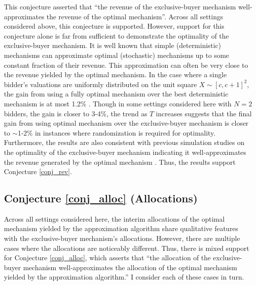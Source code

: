 This conjecture asserted that ``the revenue of the exclusive-buyer mechanism well-approximates the revenue of the optimal mechanism''. Across all settings considered above, this conjecture is supported. However, support for this conjecture alone is far from sufficient to demonstrate the optimality of the exclusive-buyer mechanism. It is well known that simple (deterministic) mechanisms can approximate optimal (stochastic) mechanisms up to some constant fraction of their revenue. This approximation can often be very close to the revenue yielded by the optimal mechanism. In the case where a single bidder's valuations are uniformly distributed on the unit square $X \sim [c,c+1]^2$, the gain from using a fully optimal mechanism over the best deterministic mechanism is at most 1.2\% \autocite[p11]{pavlov2011optimal}. Though in some settings considered here with $N=2$ bidders, the gain is closer to 3-4\%, the trend as $T$ increases suggests that the final gain from using optimal mechanism over the exclusive-buyer mechanism is closer to $\sim$1-2\% in instances where randomization is required for optimality. Furthermore, the results are also consistent with previous simulation studies on the optimality of the exclusive-buyer mechanism indicating it well-approximates the revenue generated by the optimal mechanism \autocite{belloni2010multidimensional}. Thus, the results support Conjecture \ref{conj_rev}.

\subsection{Conjecture \ref{conj_alloc} (Allocations)}

Across all settings considered here, the interim allocations of the optimal mechanism yielded by the approximation algorithm share qualitative features with the exclusive-buyer mechanism's allocations. However, there are multiple cases where the allocations are noticeably different. Thus, there is mixed support for Conjecture \ref{conj_alloc}, which asserts that ``the allocation of the exclusive-buyer mechanism well-approximates the allocation of the optimal mechanism yielded by the approximation algorithm.'' I consider each of these cases in turn.

